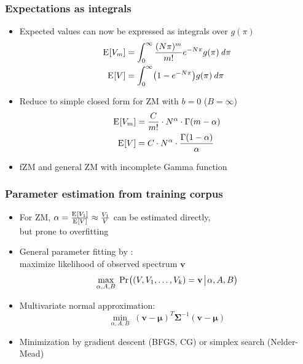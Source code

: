 \documentclass[t]{beamer} %
\begin{document}
\begin{frame}
  \frametitle{Expectations as integrals}

  \begin{itemize}
  \item Expected values can now be expressed as integrals over $g(\pi)$
    \begin{align*}
      \mathrm{E}_{}[V_m] &= \int_0^{\infty} \frac{(N\pi)^m}{m!} e^{-N\pi} g(\pi) \,\mathit{d{\pi}}\\
      \mathrm{E}_{}[V] &= \int_0^{\infty} \bigl( 1 - e^{-N\pi} \bigr) g(\pi) \,\mathit{d{\pi}}
    \end{align*}
  \item<2-> Reduce to simple closed form for ZM with $b = 0$ (\so $B = \infty$)
    \begin{align*}
      \mathrm{E}_{}[V_m] &= \frac{C}{m!} \cdot N^{\alpha} \cdot \Gamma (m - \alpha) \\
      \mathrm{E}_{}[V] &= C \cdot N^{\alpha} \cdot \frac{\Gamma(1 - \alpha)}{\alpha}
    \end{align*}
  \item<2-> fZM and general ZM with incomplete Gamma function
  \end{itemize}
\end{frame}

\begin{frame}
  \frametitle{Parameter estimation from training corpus}

  \begin{itemize}
  \item For ZM, $\alpha = \frac{\mathrm{E}_{}[V_1]}{\mathrm{E}_{}[V]} \approx \frac{V_1}{V}$ can be estimated directly,\\
    but prone to overfitting
  \item General parameter fitting by :\\
    maximize likelihood of observed spectrum $\mathbf{v}$
    \[
      \max_{\alpha, A, B}\; \mathop{\mathrm{Pr}_{}}\bigl((V, V_1, \ldots, V_k) = \mathbf{v}\!\bigm|\!\alpha, A, B\bigr)
    \]
  \item<2-> Multivariate normal approximation:\\
    \[
      \min_{\alpha, A, B}\; (\mathbf{v} - \pmb{\mu})^T \pmb{\Sigma}^{-1} (\mathbf{v} - \pmb{\mu})
    \]
  \item<2-> Minimization by gradient descent (BFGS, CG) or simplex search (Nelder-Mead)
  \end{itemize}
\end{frame}
\end{document}
